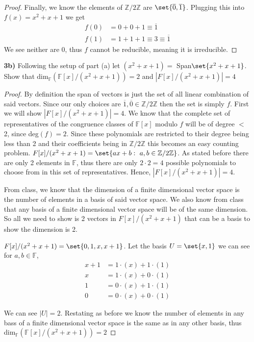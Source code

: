 \documentclass[12pt]{article}
\DeclarePairedDelimiter\set\{\}
\newcommand      {\Zm}         {{\mathbb Z}}
\newcommand      {\Fm}         {{\mathbb F}}
\begin{document}
\begin{proof}
    Finally, we know the elements of $\Zm/2\Zm$ are $\set{\overline{0},\overline{1}}$. Plugging this into $f(x) = x^2 + x + 1$ we get
    \begin{align*}
        f(0) &= 0 + 0 + 1 \equiv \overline{1} \\
        f(1) &= 1 + 1 + 1 \equiv 3 \equiv \overline{1}
    \end{align*}
    We see neither are $0$, thus $f$ cannot be reducible, meaning it is irreducible. 
\end{proof}
\newpage

\noindent\textbf{3b) } Following the setup of part (a) let $(x^2 + x + 1) =$ Span$\set{x^2 + x + 1}$. Show that dim$_\Fm(\Fm[x]/(x^2 + x + 1)) = 2$ and $|F[x]/(x^2 + x + 1)|= 4$

\begin{proof}
    By definition the span of vectors is just the set of all linear combination of said vectors. Since our only choices are  $\overline{1},\overline{0}\in\Zm/2\Zm$ then the set is simply $f$. First we will show $|F[x]/(x^2 + x + 1)|= 4$. We know that the complete set of representatives of the congruence classes of $\Fm[x]$ modulo $f$ will be of degree $<$ 2, since deg$(f) = 2$. Since these polynomials are restricted to their degree being less than 2 and their coefficients being in $\Zm/2\Zm$ this becomes an easy counting problem. $F[x]/(x^2 + x + 1) = \set{ax + b:\ a,b \in \Zm/2\Zm}$. As stated before there are only 2 elements in $\Fm$, thus there are only $2\cdot 2 = 4$ possible polynomials to choose from in this set of representatives. Hence, $|F[x]/(x^2 + x + 1)|= 4$.

    From class, we know that the dimension of a finite dimensional vector space is the number of elements in a basis of said vector space. We also know from class that any basis of a finite dimensional vector space will be of the same dimension. So all we need to show is 2 vectors in $F[x]/(x^2 + x + 1)$ that can be a basis to show the dimension is 2. 

    $F[x]/(x^2 + x + 1) = \set{0,1,x,x+1}$. Let the basis $U = \set{x,1}$ we can see for $a,b\in \Fm$,
    \begin{align*}
        x+1 &= 1 \cdot(x) + 1\cdot(1) \\
        x &= 1 \cdot(x) + 0 \cdot (1) \\
        1 &= 0 \cdot (x) + 1\cdot(1)\\
        0 &= 0 \cdot(x) + 0 \cdot(1)
    \end{align*}

    We can see $|U| = 2$. Restating as before we know the number of elements in any bass of a finite dimensional vector space is the same as in any other basis, thus dim$_\Fm(\Fm[x]/(x^2 + x + 1)) = 2$
\end{proof}
\end{document}
